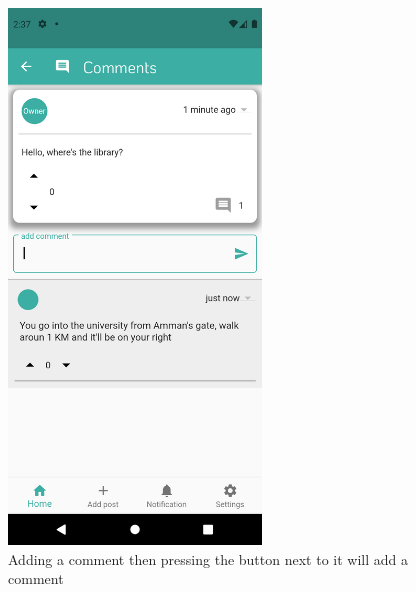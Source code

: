 \documentclass[12pt]{article}
\begin{document}
\begin{figure}[h!]
\centerline{\includegraphics[width=0.6\textwidth]{./Screenshots/15.PNG}}
  \caption{Adding a comment then pressing the button next to it will add a comment}
  \end{figure}
\end{document}
